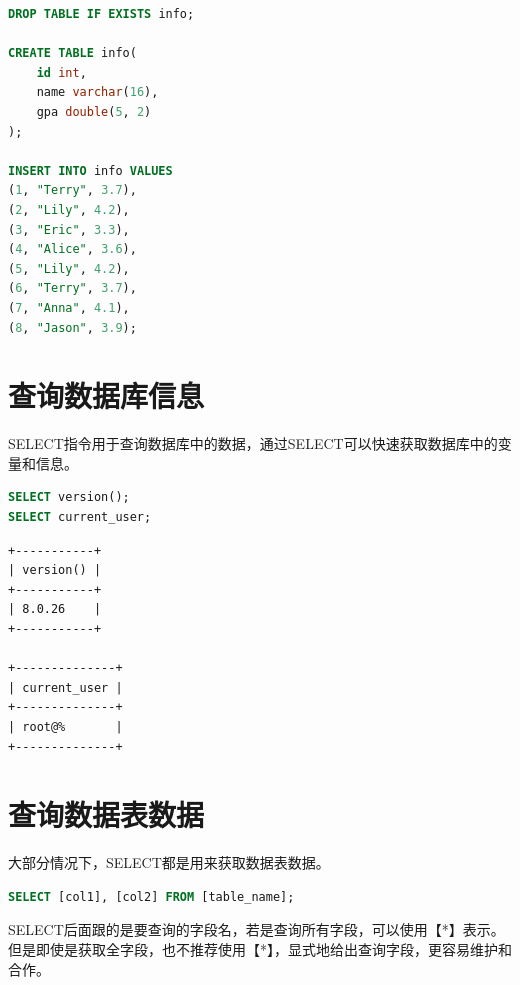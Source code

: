 \documentclass[12pt, openany, oneside]{book}
\begin{document}

\begin{lstlisting}[language=SQL]
DROP TABLE IF EXISTS info;

CREATE TABLE info(
    id int,
    name varchar(16),
    gpa double(5, 2)
);

INSERT INTO info VALUES
(1, "Terry", 3.7),
(2, "Lily", 4.2),
(3, "Eric", 3.3),
(4, "Alice", 3.6),
(5, "Lily", 4.2),
(6, "Terry", 3.7),
(7, "Anna", 4.1),
(8, "Jason", 3.9);
\end{lstlisting}

\section{查询数据库信息}

SELECT指令用于查询数据库中的数据，通过SELECT可以快速获取数据库中的变量和信息。 \\


\begin{lstlisting}[language=SQL]
SELECT version();
SELECT current_user;
\end{lstlisting}

\begin{tcolorbox}
    \begin{verbatim}
+-----------+
| version() |
+-----------+
| 8.0.26    |
+-----------+

+--------------+
| current_user |
+--------------+
| root@%       |
+--------------+
    \end{verbatim}
\end{tcolorbox}

\section{查询数据表数据}

大部分情况下，SELECT都是用来获取数据表数据。

\vspace{-0.5cm}

\begin{lstlisting}[language=SQL]
SELECT [col1], [col2] FROM [table_name];
\end{lstlisting}

SELECT后面跟的是要查询的字段名，若是查询所有字段，可以使用【*】表示。但是即使是获取全字段，也不推荐使用【*】，显式地给出查询字段，更容易维护和合作。

\vspace{-0.5cm}
\end{document}
